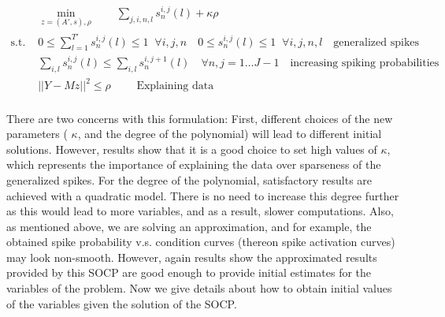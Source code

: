 \documentclass[12pt,letterpaper,fleqn]{article}
\begin{document}
  \begin{eqnarray}& \displaystyle{\min_{z=(A',s),\rho}\quad \quad  \sum_{j,i,n,l} s_n^{i,j}(l)+\kappa \rho} \\ \nonumber
  \text{s.t. } & 0\leq\sum_{l=1}^{T'} s_n^{i,j}(l)\leq 1\;\;\forall i,j,n\quad 0\leq s_n^{i,j}(l)\leq 1\;\; \forall i,j,n,l \quad \text{generalized spikes}\\ \nonumber
  & \sum_{i,l}s_n^{i,j}(l) \leq \sum_{i,l}s_n^{i,j+1}(l)\quad \forall n, j=1\ldots J-1 \quad \text{increasing spiking probabilities}\\ \nonumber 
  & ||Y-Mz||^2\leq \rho \quad \quad \text{ Explaining data} \\ \nonumber
\end{eqnarray}
 
There are two concerns with this formulation: First, different choices of the new parameters ( $\kappa$, and the degree of the polynomial) will lead to different initial solutions. However, results show that it is a good choice to set high values of $\kappa$, which represents the importance of explaining the data over sparseness of the generalized spikes. For the degree of the polynomial, satisfactory results are achieved with a quadratic model. There is no need to increase this degree further as this would lead to more variables, and as a result, slower computations. Also, as mentioned above, we are solving an approximation,  and for example, the obtained spike probability v.s. condition curves (thereon spike activation curves) may look non-smooth. However, again results show the approximated results provided by this SOCP are good enough to provide initial estimates for the variables of the problem. Now we give details about how to obtain initial values of the variables given the solution of the SOCP. \\
\end{document}
